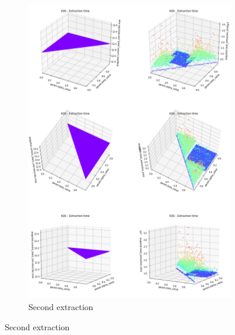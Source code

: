 \begin{figure}
\begin{subfigure}[b]{0.45\textwidth}
        \includegraphics[width=0.99\textwidth]{./fragments/04_experimental_execution/images/04_alphabeta_singleclass_stack.png}%
        \caption{Second extraction}
        \label{FIG:05_ALPHABETA_RELATIONSHIP_SINGLECLASS_STACK__0_0}
    \end{subfigure}



\end{figure}
